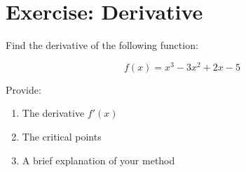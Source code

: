 \documentclass{article}
\begin{document}
\section*{Exercise: Derivative}

Find the derivative of the following function:

$$f(x) = x^3 - 3x^2 + 2x - 5$$

Provide:
\begin{enumerate}
    \item The derivative $f'(x)$
    \item The critical points
    \item A brief explanation of your method
\end{enumerate}
\end{document}
